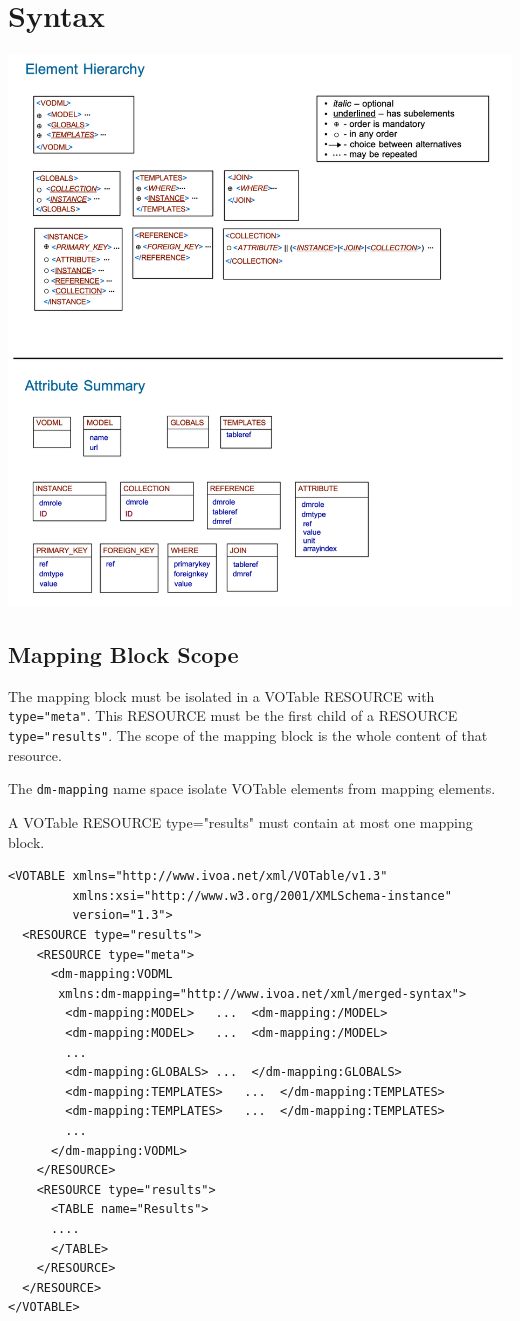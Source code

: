 \documentclass[11pt,a4paper]{ivoa}
\begin{document}
\section{Syntax}
\includegraphics[width=\textwidth]{merged-syntax-summary.png}

\subsection{Mapping Block Scope}
The mapping block must be isolated in a VOTable RESOURCE with \texttt{type="meta"}. This RESOURCE must be the first child of a RESOURCE \texttt{type="results"}. The scope of the mapping block is the whole content of that resource.

The \texttt{dm-mapping} name space isolate VOTable elements from mapping elements.

A  VOTable RESOURCE {type="results"} must contain at most one mapping block.
 
\begin{lstlisting}[caption={Mapping block in a VOTable},style=XML,basicstyle=\small]
<VOTABLE xmlns="http://www.ivoa.net/xml/VOTable/v1.3" 
         xmlns:xsi="http://www.w3.org/2001/XMLSchema-instance"
	     version="1.3">
  <RESOURCE type="results">
    <RESOURCE type="meta">
      <dm-mapping:VODML 
       xmlns:dm-mapping="http://www.ivoa.net/xml/merged-syntax">
        <dm-mapping:MODEL>   ...  <dm-mapping:/MODEL>
        <dm-mapping:MODEL>   ...  <dm-mapping:/MODEL>
        ...
        <dm-mapping:GLOBALS> ...  </dm-mapping:GLOBALS>
        <dm-mapping:TEMPLATES>   ...  </dm-mapping:TEMPLATES>
        <dm-mapping:TEMPLATES>   ...  </dm-mapping:TEMPLATES>
        ...
      </dm-mapping:VODML>
    </RESOURCE>
    <RESOURCE type="results">
      <TABLE name="Results">
      ....
      </TABLE>
    </RESOURCE>
  </RESOURCE>
</VOTABLE>

\end{lstlisting}
\end{document}
